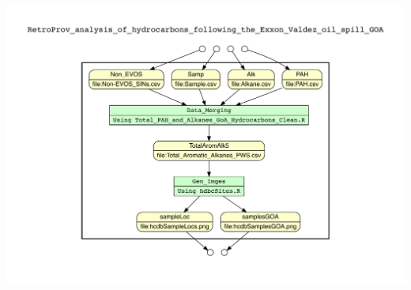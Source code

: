 \documentclass[]{article}
\begin{document}
\includegraphics{./results/aoos_retro_wf_graph.pdf}
\end{document}
